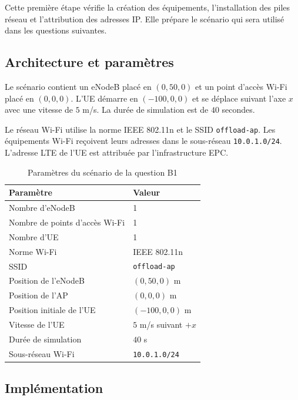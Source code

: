 Cette première étape vérifie la création des équipements,
l'installation des piles réseau et l'attribution des adresses IP.
Elle prépare le scénario qui sera utilisé dans les questions
suivantes.

\subsection{Architecture et paramètres}

Le scénario contient un eNodeB placé en $(0,50,0)$ et un point
d'accès Wi-Fi placé en $(0,0,0)$. L'UE démarre en $(-100,0,0)$
et se déplace suivant l'axe $x$ avec une vitesse de $5$ m/s.
La durée de simulation est de $40$ secondes.

Le réseau Wi-Fi utilise la norme IEEE 802.11n et le SSID
\texttt{offload-ap}. Les équipements Wi-Fi reçoivent leurs
adresses dans le sous-réseau \texttt{10.0.1.0/24}. L'adresse
LTE de l'UE est attribuée par l'infrastructure EPC.

\begin{table}[H]
    \centering
    \caption{Paramètres du scénario de la question B1}
    \label{tab:b1-parametres}
    \begin{tabular}{ll}
        \toprule
        \textbf{Paramètre} & \textbf{Valeur} \\
        \midrule
        Nombre d'eNodeB & 1 \\
        Nombre de points d'accès Wi-Fi & 1 \\
        Nombre d'UE & 1 \\
        Norme Wi-Fi & IEEE 802.11n \\
        SSID & \texttt{offload-ap} \\
        Position de l'eNodeB & $(0,50,0)$ m \\
        Position de l'AP & $(0,0,0)$ m \\
        Position initiale de l'UE & $(-100,0,0)$ m \\
        Vitesse de l'UE & $5$ m/s suivant $+x$ \\
        Durée de simulation & $40$ s \\
        Sous-réseau Wi-Fi & \texttt{10.0.1.0/24} \\
        \bottomrule
    \end{tabular}
\end{table}

\subsection{Implémentation}


